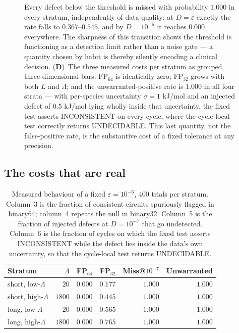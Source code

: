 \documentclass[11pt,twocolumn,a4paper]{article}
\theoremstyle{pstyle}
\theoremstyle{definition}
\theoremstyle{remark}
\newcommand{\eps}{\varepsilon}
\begin{document}
\begin{figure}[!htbp]
{    Every defect below the threshold is missed with probability
    $1.000$ in every stratum, independently of data quality; at
    $D = \eps$ exactly the rate falls to $0.367$--$0.545$, and by
    $D = 10^{-5}$ it reaches $0.000$ everywhere.
    The sharpness of this transition shows the threshold is functioning
    as a detection limit rather than a noise gate --- a quantity chosen
    by habit is thereby silently encoding a clinical decision.
    (\textbf{D})~The three measured costs per stratum as grouped
    three-dimensional bars.
    $\mathrm{FP}_{64}$ is identically zero; $\mathrm{FP}_{32}$ grows
    with both $L$ and $\Lambda$; and the unwarranted-positive rate is
    $1.000$ in all four strata --- with per-species uncertainty
    $\sigma = 1$ kJ/mol and an injected defect of $0.5$ kJ/mol lying
    wholly inside that uncertainty, the fixed test asserts
    \textsf{INCONSISTENT} on every cycle, where the cycle-local test
    correctly returns \textsf{UNDECIDABLE}.
    This last quantity, not the false-positive rate, is the substantive
    cost of a fixed tolerance at any precision.}
    \label{fig:tol_panel2}
\end{figure}

\subsection{The costs that are real}

\begin{table}[t]
\centering\small
\caption{Measured behaviour of a fixed $\eps=10^{-6}$, $400$ trials per
stratum. Column~3 is the fraction of consistent circuits spuriously
flagged in binary64; column~4 repeats the null in binary32. Column~5 is
the fraction of injected defects at $D=10^{-7}$ that go undetected.
Column~6 is the fraction of cycles on which the fixed test asserts
\textsf{INCONSISTENT} while the defect lies inside the data's own
uncertainty, so that the cycle-local test returns \textsf{UNDECIDABLE}.}
\label{tab:v2}
\begin{tabular}{@{}lrrrrr@{}}
\toprule
Stratum & $\Lambda$ & FP$_{64}$ & FP$_{32}$ & Miss@$10^{-7}$ &
Unwarranted\\
\midrule
short, low-$\Lambda$   & $20$   & $0.000$ & $0.177$ & $1.000$ & $1.000$\\
short, high-$\Lambda$  & $1800$ & $0.000$ & $0.445$ & $1.000$ & $1.000$\\
long, low-$\Lambda$    & $20$   & $0.000$ & $0.565$ & $1.000$ & $1.000$\\
long, high-$\Lambda$   & $1800$ & $0.000$ & $0.765$ & $1.000$ & $1.000$\\
\bottomrule
\end{tabular}
\end{table}
\end{document}
